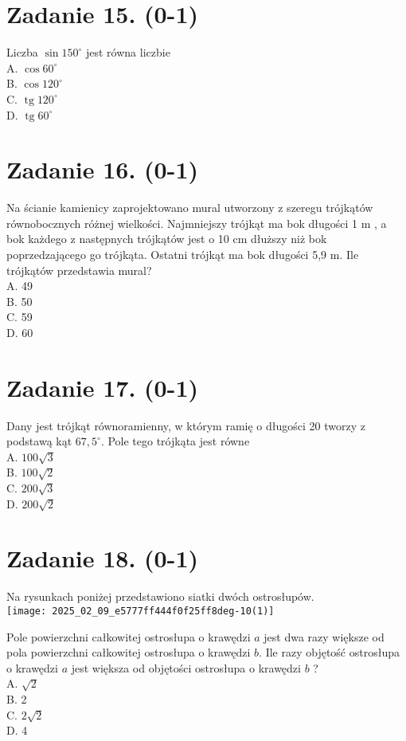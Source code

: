 \documentclass[10pt]{article}
\begin{document}
\section*{Zadanie 15. (0-1)}
Liczba \(\sin 150^{\circ}\) jest równa liczbie\\
A. \(\cos 60^{\circ}\)\\
B. \(\cos 120^{\circ}\)\\
C. \(\operatorname{tg} 120^{\circ}\)\\
D. \(\operatorname{tg} 60^{\circ}\)

\section*{Zadanie 16. (0-1)}
Na ścianie kamienicy zaprojektowano mural utworzony z szeregu trójkątów równobocznych różnej wielkości. Najmniejszy trójkąt ma bok długości 1 m , a bok każdego z następnych trójkątów jest o 10 cm dłuższy niż bok poprzedzającego go trójkąta. Ostatni trójkąt ma bok długości 5,9 m. Ile trójkątów przedstawia mural?\\
A. 49\\
B. 50\\
C. 59\\
D. 60

\section*{Zadanie 17. (0-1)}
Dany jest trójkąt równoramienny, w którym ramię o długości 20 tworzy z podstawą kąt \(67,5^{\circ}\). Pole tego trójkąta jest równe\\
A. \(100 \sqrt{3}\)\\
B. \(100 \sqrt{2}\)\\
C. \(200 \sqrt{3}\)\\
D. \(200 \sqrt{2}\)

\section*{Zadanie 18. (0-1)}
Na rysunkach poniżej przedstawiono siatki dwóch ostrosłupów.\\
\texttt{[image: 2025\_02\_09\_e5777ff444f0f25ff8deg-10(1)]}

Pole powierzchni całkowitej ostrosłupa o krawędzi \(a\) jest dwa razy większe od pola powierzchni całkowitej ostrosłupa o krawędzi \(b\). Ile razy objętość ostrosłupa o krawędzi \(a\) jest większa od objętości ostrosłupa o krawędzi \(b\) ?\\
A. \(\sqrt{2}\)\\
B. 2\\
C. \(2 \sqrt{2}\)\\
D. 4
\end{document}
